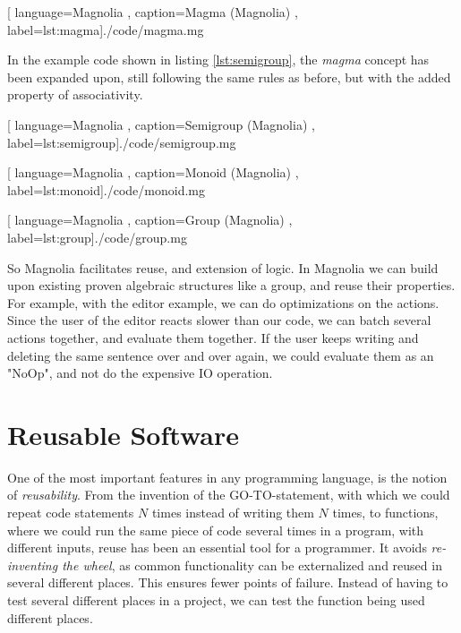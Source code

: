 \begin{center}
  
    [ language=Magnolia
    , caption={Magma (Magnolia)}
    , label=lst:magma]{./code/magma.mg}
\end{center}

In the example code shown in listing \ref{lst:semigroup}, the \textit{magma}
concept has been expanded upon, still following the same rules as before, but
with the added property of associativity.

\begin{center}
  
    [ language=Magnolia
    , caption={Semigroup (Magnolia)}
    , label=lst:semigroup]{./code/semigroup.mg}
\end{center}

\begin{center}
  
    [ language=Magnolia
    , caption={Monoid (Magnolia)}
    , label=lst:monoid]{./code/monoid.mg}
\end{center}

\begin{center}
  
    [ language=Magnolia
    , caption={Group (Magnolia)}
    , label=lst:group]{./code/group.mg}
\end{center}

So Magnolia facilitates reuse, and extension of logic. In Magnolia we can build
upon existing proven algebraic structures like a group, and reuse their
properties. For example, with the editor example, we can do optimizations on
the actions. Since the user of the editor reacts slower than our code, we can
batch several actions together, and evaluate them together. If the user keeps
writing and deleting the same sentence over and over again, we could evaluate
them as an "NoOp", and not do the expensive IO operation.

\section{Reusable Software}

One of the most important features in any programming language, is the notion
of \textit{reusability}. From the invention of the GO-TO-statement, with which
we could repeat code statements $N$ times instead of writing them $N$ times, to
functions, where we could run the same piece of code several times in a
program, with different inputs, reuse has been an essential tool for a
programmer. It avoids \textit{re-inventing the wheel}, as common functionality
can be externalized and reused in several different places. This ensures
fewer points of failure. Instead of having to test several different places in
a project, we can test the function being used different places.

